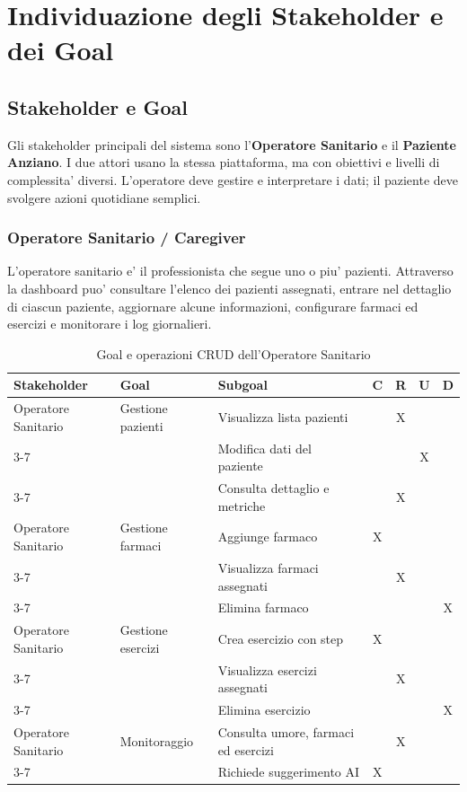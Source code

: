 \section{Individuazione degli Stakeholder e dei Goal}

\subsection{Stakeholder e Goal}

Gli stakeholder principali del sistema sono l'\textbf{Operatore Sanitario} e il \textbf{Paziente Anziano}. I due attori usano la stessa piattaforma, ma con obiettivi e livelli di complessita' diversi. L'operatore deve gestire e interpretare i dati; il paziente deve svolgere azioni quotidiane semplici.

\subsubsection{Operatore Sanitario / Caregiver}

L'operatore sanitario e' il professionista che segue uno o piu' pazienti. Attraverso la dashboard puo' consultare l'elenco dei pazienti assegnati, entrare nel dettaglio di ciascun paziente, aggiornare alcune informazioni, configurare farmaci ed esercizi e monitorare i log giornalieri.

\begin{table}[H]
\centering
\footnotesize
\renewcommand{\arraystretch}{1.25}
\begin{tabular}{|p{3.2cm}|p{4.4cm}|p{4.7cm}|c|c|c|c|}
\hline
\textbf{Stakeholder} & \textbf{Goal} & \textbf{Subgoal} & \textbf{C} & \textbf{R} & \textbf{U} & \textbf{D} \\
\hline
Operatore Sanitario & Gestione pazienti & Visualizza lista pazienti & & X & & \\
\cline{3-7}
 & & Modifica dati del paziente & & & X & \\
\cline{3-7}
 & & Consulta dettaglio e metriche & & X & & \\
\hline
Operatore Sanitario & Gestione farmaci & Aggiunge farmaco & X & & & \\
\cline{3-7}
 & & Visualizza farmaci assegnati & & X & & \\
\cline{3-7}
 & & Elimina farmaco & & & & X \\
\hline
Operatore Sanitario & Gestione esercizi & Crea esercizio con step & X & & & \\
\cline{3-7}
 & & Visualizza esercizi assegnati & & X & & \\
\cline{3-7}
 & & Elimina esercizio & & & & X \\
\hline
Operatore Sanitario & Monitoraggio & Consulta umore, farmaci ed esercizi & & X & & \\
\cline{3-7}
 & & Richiede suggerimento AI & X & & & \\
\hline
\end{tabular}
\caption{Goal e operazioni CRUD dell'Operatore Sanitario}
\label{tab:goal-operatore}
\end{table}

